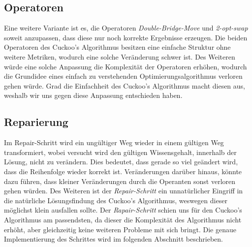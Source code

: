 \documentclass[conference]{IEEEtran}
\begin{document}
    \subsection{Operatoren} 
      Eine weitere Variante ist es, die Operatoren \textit{Double-Bridge-Move} und \textit{2-opt-swap} soweit anzupassen, dass diese
      nur noch korrekte Ergebnisse erzeugen. Die beiden Operatoren des Cuckoo's Algorithmus besitzen eine einfache 
      Struktur ohne weitere Metriken, wodurch eine solche Veränderung schwer ist. 
      Des Weiteren würde eine solche Anpassung die Komplexität der Operatoren erhöhen, wodurch die Grundidee eines 
      einfach zu verstehenden Optimierungsalgorithmus verloren gehen würde. 
      Grad die Einfachheit des Cuckoo's Algorithmus macht diesen aus, weshalb wir uns gegen diese Anpassung entschieden haben.


    \subsection{Reparierung}
      Im Repair-Schritt wird ein ungültiger Weg wieder in einem gültigen Weg transformiert, wobei 
      versucht wird den gültigen Wissensgehalt, innerhalb der Lösung, nicht zu verändern. Dies bedeutet, 
      dass gerade so viel geändert wird, dass die Reihenfolge wieder korrekt ist. Veränderungen darüber hinaus, 
      könnte dazu führen, dass kleiner Veränderungen durch die Operanten sonst verloren gehen würden.
      Des Weiteren ist der \textit{Repair-Schritt} ein unnatürlicher Eingriff in die natürliche Lösungsfindung des Cuckoo's Algorithmus, 
      weswegen dieser möglichst klein ausfallen sollte.
      Der \textit{Rapair-Schritt} schien uns für den Cuckoo's Algorithmus am passendsten, da dieser die Komplexität des Algorithmus nicht erhöht, aber 
      gleichzeitig keine weiteren Probleme mit sich bringt. 
      Die genaue Implementierung des Schrittes wird im folgenden Abschnitt beschrieben.
\end{document}
